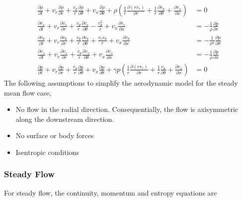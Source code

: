 \begin{align}
\frac{\partial \rho}{\partial t} + %
v_r \frac{\partial \rho}{\partial r} +
\frac{v_{\theta}   }{r}
\frac{\partial \rho}{\partial \theta} +
v_x \frac{\partial \rho}{\partial \theta} + 
\rho 
\left(
\frac{1}{r} \frac{\partial (rv_r)	}{\partial r} +
\frac{1}{r}	\frac{\partial v_{\theta}}{\partial \theta} +
\frac{\partial v_x}{\partial x}
\right) 
&= 0 \\%
\frac{\partial v_r}{\partial t} + 
v_r \frac{\partial v_r}{\partial r} +
\frac{v_{\theta}  }{r}
\frac{\partial v_r}{\partial \theta}- \frac{v_{\theta}^2}{r}+ 
v_x \frac{\partial v_r}{\partial x} 
&= -\frac{1}{\rho} \frac{\partial p}{\partial r}\\  
\frac{\partial v_{\theta}}{\partial t} + 
v_r \frac{\partial v_{\theta}}{\partial r} +
\frac{v_{\theta}}{r}
\frac{\partial v_{\theta}}{\partial \theta} +
\frac{v_r v_{\theta}}{r}+ 
v_x \frac{\partial v_{\theta}}{\partial x} 
&= -\frac{1}{\rho r} \frac{\partial p}{\partial \theta}\\ 
\frac{\partial v_{x}}{\partial t} + 
v_r 
\frac{\partial v_x}{\partial r} +
\frac{v_{\theta}}{r}
\frac{\partial v_x}{\partial \theta}+ 
v_x \frac{\partial v_x}{\partial x} 
&= 
-\frac{1}{\rho } 
\frac{\partial p}{\partial x}\\  
\frac{\partial p }{\partial t} +
v_r 
\frac{\partial p}{\partial r} +
\frac{v_{\theta}}{r}
\frac{\partial p}{\partial \theta} +
v_x \frac{\partial p}{\partial \theta} + 
\gamma p 
\left(
\frac{1}{r}\frac{\partial (rv_r)}{\partial r} +
\frac{1}{r}\frac{v_{\theta}}{\partial \theta} +
\frac{\partial v_x}{\partial x}
\right) &= 0
\end{align}
The following assumptions to simplify the aerodynamic model for the steady mean
flow case,

\begin{itemize}
    \item No flow in the radial direction. Consequentially, the flow is 
        axisymmetric along the downstream direction.
    \item No surface or body forces
    \item Isentropic conditions 
\end{itemize}

\subsubsection{Steady Flow}
For steady flow, the continuity, momentum and entropy equations are

